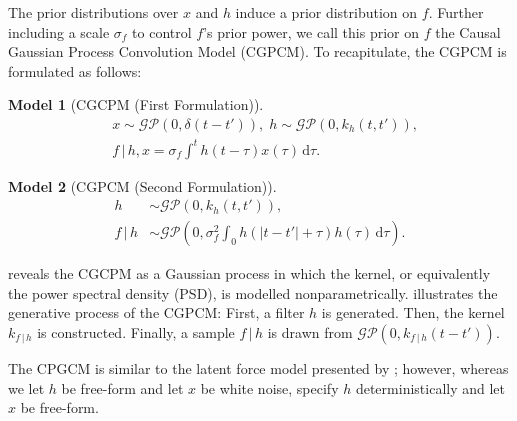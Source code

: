 \documentclass{article}
\newcommand{\id}[1]{\, \mathrm{d} #1}     %
\newcommand{\cond}{\, | \,}               %
\newtheorem{model}{Model}
\begin{document}
The prior distributions over $x$ and $h$ induce a prior distribution on $f$. Further including a scale $\sigma_f$ to control $f$'s prior power, we call this prior on $f$ the Causal Gaussian Process Convolution Model (CGPCM). To recapitulate, the CGPCM is formulated as follows:

\begin{model}[CGCPM (First Formulation)] \label{mod:cgpcm}
    \begin{align*}
        &x \sim \mathcal{GP}(0,\delta(t-t')), \;
        h \sim \mathcal{GP}(0, k_h(t,t')), \\
        &f\cond h, x = \sigma_f \int^t h(t- \tau)x(\tau)\id{\tau}.
    \end{align*}
\end{model}
\begin{model}[CGPCM (Second Formulation)] \label{mod:cgpcm2}
    \begin{align*}
        h &\sim \mathcal{GP}(0, k_h(t,t')), \\
        f \cond h &\sim \mathcal{GP}\left(0,  \sigma_f^2\int_0 h(|t-t'|+\tau)h(\tau)\id{\tau} \right).
    \end{align*}
\end{model}

 reveals the CGCPM as a Gaussian process in which the kernel, or equivalently the power spectral density (PSD), is modelled nonparametrically.  illustrates the generative process of the CGPCM: First, a filter $h$ is generated. Then, the kernel $k_{f\cond h}$ is constructed. Finally, a sample $f\cond h$ is drawn from $\mathcal{GP}(0,k_{f \cond h}(t-t'))$.

The CPGCM is similar to the latent force model presented by \citet{Alvarez:2009:Latent_Force_Models}; however, whereas we let $h$ be free-form and let $x$ be white noise, \citet{Alvarez:2009:Latent_Force_Models} specify $h$ deterministically and let $x$ be free-form.
\end{document}
